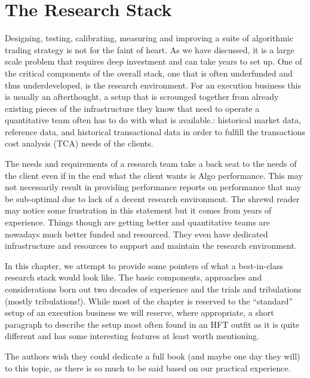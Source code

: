 \chapter{The Research Stack\label{chap:ch_tech_res}}\label{in:research_stack1}

Designing, testing, calibrating, measuring and improving a suite of algorithmic trading strategy is not for the faint of heart. As we have discussed, it is a large scale problem that requires deep investment and can take years to set up. One of the critical components of the overall stack, one that is often underfunded and thus underdeveloped, is the research environment. For an execution business this is usually an afterthought, a setup that is scrounged together from already existing pieces of the infrastructure they know that need to operate a quantitative team often has to do with what is available.: historical market data, reference data, and historical transactional data in order to fulfill the transactions cost analysis (TCA) needs of the clients.


The needs and requirements of a research team take a back seat to the needs of the client even if in the end what the client wants is Algo performance. This may not necessarily result in providing performance reports on  performance that may be sub-optimal due to lack of a decent research environment. The shrewd reader may notice some frustration in this statement but it comes from years of experience. Things though are getting better and quantitative teams are nowadays much better funded and resourced. They even have dedicated infrastructure and resources to support and maintain the research environment.


In this chapter, we attempt to provide some pointers of what a best-in-class research stack would look like. The basic components, approaches and considerations born out two decades of experience and the trials and tribulations (mostly tribulations!). While most of the chapter is reserved to the ``standard'' setup of an execution business we will reserve, where appropriate, a short paragraph to describe the setup most often found in an HFT outfit as it is quite different and has some interesting features at least worth mentioning.


The authors wish they could dedicate a full book (and maybe one day they will) to this topic, as there is so much to be said based on our practical experience. 



